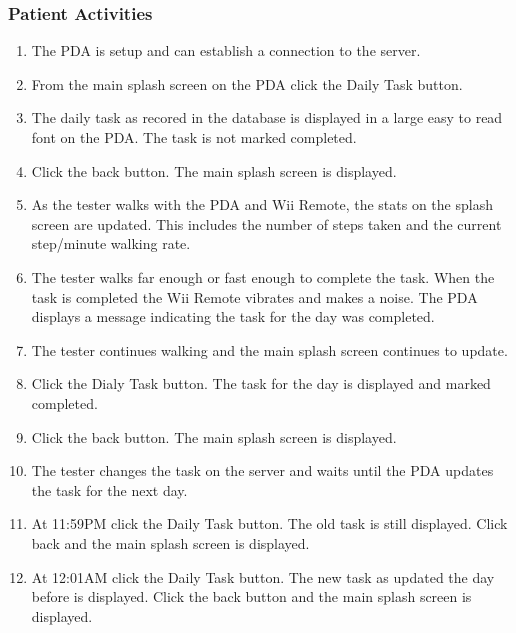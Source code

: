 \documentclass{article}
\begin{document}
\subsubsection{Patient Activities}
\begin{enumerate}
\item The PDA is setup and can establish a connection to the server.
\item From the main splash screen on the PDA click the Daily Task button.
\item The daily task as recored in the database is displayed in a large easy to read font on the PDA.  The task is not marked completed.
\item Click the back button. The main splash screen is displayed.
\item As the tester walks with the PDA and Wii Remote, the stats on the splash screen are updated. This includes the number of steps taken and the current step/minute walking rate.
\item The tester walks far enough or fast enough to complete the task. When the task is completed the Wii Remote vibrates and makes a noise. The PDA displays a message indicating the task for the day was completed.
\item The tester continues walking and the main splash screen continues to update.
\item Click the Dialy Task button. The task for the day is displayed and marked completed.
\item Click the back button. The main splash screen is displayed.
\item The tester changes the task on the server and waits until the PDA updates the task for the next day.
\item At 11:59PM click the Daily Task button. The old task is still displayed. Click back and the main splash screen is displayed.
\item At 12:01AM click the Daily Task button. The new task as updated the day before is displayed.  Click the back button and the main splash screen is displayed.
\end{enumerate}
\end{document}
